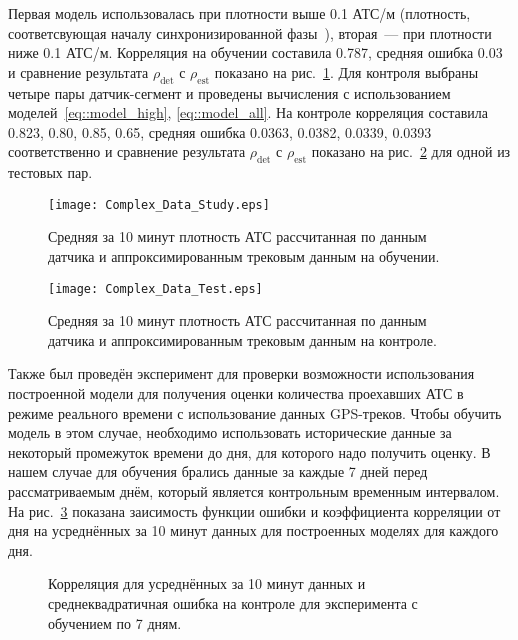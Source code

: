 Первая модель использовалась при плотности выше 0.1 АТС/м (плотность, соответсвующая началу синхронизированной фазы~\cite{collectiveArticle}), вторая~--- при плотности ниже 0.1 АТС/м.
Корреляция на обучении составила 0.787, средняя ошибка 0.03 и сравнение результата $\rho_\text{det}$ с $\rho_\text{est}$ показано на рис.~\ref{fig:cstudy}.
Для контроля выбраны четыре пары датчик-сегмент и проведены вычисления с использованием моделей~\eqref{eq::model_high}, \eqref{eq::model_all}.
На контроле корреляция составила 0.823, 0.80, 0.85, 0.65, средняя ошибка 0.0363, 0.0382, 0.0339, 0.0393 соответственно и сравнение результата $\rho_\text{det}$ с $\rho_\text{est}$ показано на рис.~\ref{fig:ctest} для одной из тестовых пар.
\begin{figure}[!ht]
\begin{center}
\texttt{[image: Complex\_Data\_Study.eps]}
\caption{Средняя за 10 минут плотность АТС рассчитанная по данным датчика и аппроксимированным трековым данным на обучении.}
\label{fig:cstudy}
\end{center}
\end{figure}
\begin{figure}[!ht]
\begin{center}
\texttt{[image: Complex\_Data\_Test.eps]}
\caption{Средняя за 10 минут плотность АТС рассчитанная по данным датчика и аппроксимированным трековым данным на контроле.}
\label{fig:ctest}
\end{center}
\end{figure}

Также был проведён эксперимент для проверки возможности использования построенной модели для получения оценки количества проехавших АТС в режиме реального времени с использование данных GPS-треков.
Чтобы обучить модель в этом случае, необходимо использовать исторические данные за некоторый промежуток времени до дня, для которого надо получить оценку.
В нашем случае для обучения брались данные за каждые 7 дней перед рассматриваемым днём, который является контрольным временным интервалом.
На рис.~\ref{fig:weeklearn} показана заисимость функции ошибки и коэффициента корреляции от дня на усреднённых за 10 минут данных для построенных моделях для каждого дня.
\begin{figure}[!ht]
\caption{Корреляция для усреднённых за 10 минут данных и среднеквадратичная ошибка на контроле для эксперимента с обучением по 7 дням.}
\label{fig:weeklearn}
\end{figure}


